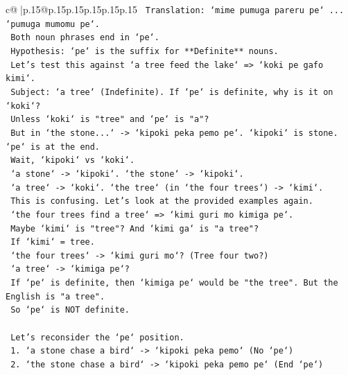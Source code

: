 \documentclass{article}
\begin{document}
{\begin{supertabular}{c@{$\;$}|p{.15\linewidth}@{}p{.15\linewidth}p{.15\linewidth}p{.15\linewidth}p{.15\linewidth}p{.15\linewidth}}
{{{\texttt{                    Translation: `mime pumuga pareru pe` ... `pumuga mumomu pe`.} \\
\texttt{                    Both noun phrases end in `pe`.} \\
\texttt{                    Hypothesis: `pe` is the suffix for **Definite** nouns.} \\
\texttt{                    Let's test this against `a tree feed the lake` => `koki pe gafo kimi`.} \\
\texttt{                    Subject: `a tree` (Indefinite). If `pe` is definite, why is it on `koki`?} \\
\texttt{                    Unless `koki` is "tree" and `pe` is "a"?} \\
\texttt{                    But in `the stone...` {-}> `kipoki peka pemo pe`. `kipoki` is stone. `pe` is at the end.} \\
\texttt{                    Wait, `kipoki` vs `koki`.} \\
\texttt{                    `a stone` {-}> `kipoki`. `the stone` {-}> `kipoki`.} \\
\texttt{                    `a tree` {-}> `koki`. `the tree` (in `the four trees`) {-}> `kimi`.} \\
\texttt{                    This is confusing. Let's look at the provided examples again.} \\
\texttt{                    `the four trees find a tree` => `kimi guri mo kimiga pe`.} \\
\texttt{                    Maybe `kimi` is "tree"? And `kimi ga` is "a tree"?} \\
\texttt{                    If `kimi` = tree.} \\
\texttt{                    `the four trees` {-}> `kimi guri mo`? (Tree four two?)} \\
\texttt{                    `a tree` {-}> `kimiga pe`?} \\
\texttt{                    If `pe` is definite, then `kimiga pe` would be "the tree". But the English is "a tree".} \\
\texttt{                    So `pe` is NOT definite.} \\
\\ 
\texttt{                    Let's reconsider the `pe` position.} \\
\texttt{                    1. `a stone chase a bird` {-}> `kipoki peka pemo` (No `pe`)} \\
\texttt{                    2. `the stone chase a bird` {-}> `kipoki peka pemo pe` (End `pe`)} \\
}}}
\end{supertabular}}
\end{document}
